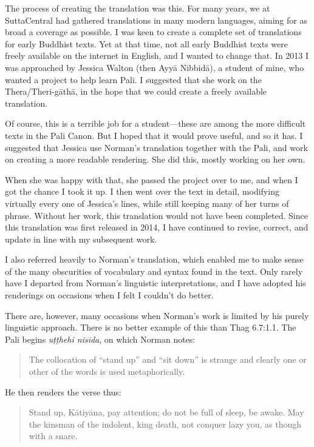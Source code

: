 \documentclass[12pt,openany]{book}%
\begin{document}
The process of creating the translation was this. For many years, we at SuttaCentral had gathered translations in many modern languages, aiming for as broad a coverage as possible. I was keen to create a complete set of translations for early Buddhist texts. Yet at that time, not all early Buddhist texts were freely available on the internet in English, and I wanted to change that. In 2013 I was approached by Jessica Walton (then \textsanskrit{Ayyā} \textsanskrit{Nibbidā}), a student of mine, who wanted a project to help learn Pali. I suggested that she work on the Thera/Theri-\textsanskrit{gāthā}, in the hope that we could create a freely available translation.

Of course, this is a terrible job for a student—these are among the more difficult texts in the Pali Canon. But I hoped that it would prove useful, and so it has. I suggested that Jessica use Norman’s translation together with the Pali, and work on creating a more readable rendering. She did this, mostly working on her own.

When she was happy with that, she passed the project over to me, and when I got the chance I took it up. I then went over the text in detail, modifying virtually every one of Jessica’s lines, while still keeping many of her turns of phrase. Without her work, this translation would not have been completed. Since this translation was first released in 2014, I have continued to revise, correct, and update in line with my subsequent work.

I also referred heavily to Norman’s translation, which enabled me to make sense of the many obscurities of vocabulary and syntax found in the text. Only rarely have I departed from Norman’s linguistic interpretations, and I have adopted his renderings on occasions when I felt I couldn’t do better.

There are, however, many occasions when Norman’s work is limited by his purely linguistic approach. There is no better example of this than Thag 6.7:1.1. The Pali begins \textit{\textsanskrit{uṭṭhehi} \textsanskrit{nisīda}}, on which Norman notes:

\begin{quotation}%
The collocation of “stand up” and “sit down” is strange and clearly one or other of the words is used metaphorically.

%
\end{quotation}

He then renders the verse thus:

\begin{quotation}%
Stand up, \textsanskrit{Kātiyāna}, pay attention; do not be full of sleep, be awake. May the kinsman of the indolent, king death, not conquer lazy you, as though with a snare.

%
\end{quotation}
\end{document}
